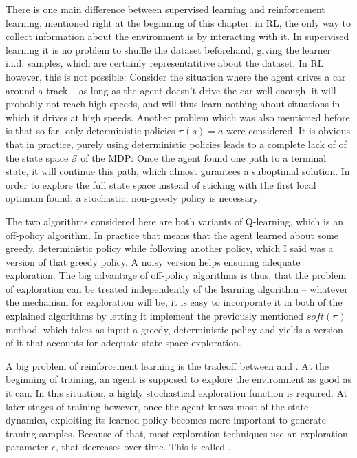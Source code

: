 There is one main difference between supervised learning and reinforcement learning, mentioned right at the beginning of this chapter: in RL, the only way to collect information about the environment is by interacting with it. In supervised learning it is no problem to shuffle the dataset beforehand, giving the learner i.i.d. samples, which are certainly representatitive about the dataset. In RL however, this is not possible: Consider the situation where the agent drives a car around a track -- as long as the agent doesn't drive the car well enough, it will probably not reach high speeds, and will thus learn nothing about situations in which it drives at high speeds. Another problem which was also mentioned before is that so far, only deterministic policies $\pi(s) = a$ were considered. It is obvious that in practice, purely using deterministic policies leads to a complete lack of  of the state space $\mathcal{S}$ of the MDP: Once the agent found one path to a terminal state, it will continue  this path, which almost gurantees a suboptimal solution. In order to explore the full state space instead of sticking with the first local optimum found, a stochastic, non-greedy policy is necessary.

The two algorithms considered here are both variants of Q-learning, which is an off-policy algorithm. In practice that means that the agent learned about some greedy, deterministic policy while following another policy, which I said was a  version of that greedy policy. A noisy version helps ensuring adequate exploration. The big advantage of off-policy algorithms is thus, that the problem of exploration can be treated independently of the learning algorithm -- whatever the mechanism for exploration will be, it is easy to incorporate it in both of the explained algorithms by letting it implement the previously mentioned $soft(\pi)$ method, which takes as input a greedy, deterministic policy and yields a version of it that accounts for adequate state space exploration.

A big problem of reinforcement learning is the tradeoff between  and . At the beginning of training, an agent is supposed to explore the environment as good as it can. In this situation, a highly stochastical exploration function is required. At later stages of training however, once the agent knows most of the state dynamics, exploiting its learned policy becomes more important to generate traning samples. Because of that, most exploration techniques use an exploration parameter $\epsilon$, that decreases over time. This is called .

